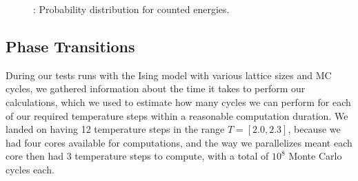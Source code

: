 \documentclass{article}
\begin{document}
{{		\begin{figure}[H]
		\caption{: Probability distribution for counted energies.}
		\label{fig:probability}
		\end{figure}

	\subsection{Phase Transitions}
		During our tests runs with the Ising model with various lattice sizes and MC cycles, we gathered information about the time it takes to perform our calculations, which we used to estimate how many cycles we can perform for each of our required temperature steps within a reasonable computation duration. We landed on having 12 temperature steps in the range $T = [2.0, 2.3]$, because we had four cores available for computations, and the way we parallelizes meant each core then had 3 temperature steps to compute, with a total of $10^8$ Monte Carlo cycles each.

}}
\end{document}
